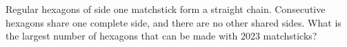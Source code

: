 Regular hexagons of side one matchstick form a straight chain. Consecutive hexagons share one complete side, and there are no other shared sides. What is the largest number of hexagons that can be made with 2023 matchsticks?
